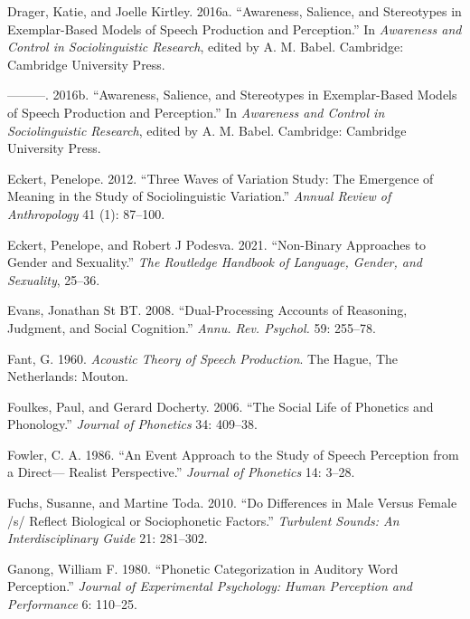 \documentclass[
  letterpaper,
  DIV=11,
  numbers=noendperiod]{scrartcl}
\newlength{\cslhangindent}
\newenvironment{CSLReferences}[2] %
 {\begin{list}{}{%
  \setlength{\itemindent}{0pt}
  \setlength{\leftmargin}{0pt}
  \setlength{\parsep}{0pt}
  \ifodd #1
   \setlength{\leftmargin}{\cslhangindent}
   \setlength{\itemindent}{-1\cslhangindent}
  \fi
  \setlength{\itemsep}{#2\baselineskip}}}
 {\end{list}}
\begin{document}
\begin{CSLReferences}{1}{0}
Drager, Katie, and Joelle Kirtley. 2016a. {``Awareness, Salience, and
Stereotypes in Exemplar-Based Models of Speech Production and
Perception.''} In \emph{Awareness and Control in Sociolinguistic
Research}, edited by A. M. Babel. Cambridge: Cambridge University Press.

---------. 2016b. {``Awareness, Salience, and Stereotypes in
Exemplar-Based Models of Speech Production and Perception.''} In
\emph{Awareness and Control in Sociolinguistic Research}, edited by A.
M. Babel. Cambridge: Cambridge University Press.

Eckert, Penelope. 2012. {``Three Waves of Variation Study: {The}
Emergence of Meaning in the Study of Sociolinguistic Variation.''}
\emph{Annual Review of Anthropology} 41 (1): 87--100.

Eckert, Penelope, and Robert J Podesva. 2021. {``Non-Binary Approaches
to Gender and Sexuality.''} \emph{The Routledge Handbook of Language,
Gender, and Sexuality}, 25--36.

Evans, Jonathan St BT. 2008. {``Dual-Processing Accounts of Reasoning,
Judgment, and Social Cognition.''} \emph{Annu. Rev. Psychol.} 59:
255--78.

Fant, G. 1960. \emph{Acoustic Theory of Speech Production}. The Hague,
The Netherlands: Mouton.

Foulkes, Paul, and Gerard Docherty. 2006. {``The Social Life of
Phonetics and Phonology.''} \emph{Journal of Phonetics} 34: 409--38.

Fowler, C. A. 1986. {``An Event Approach to the Study of Speech
Perception from a Direct--- Realist Perspective.''} \emph{Journal of
Phonetics} 14: 3--28.

Fuchs, Susanne, and Martine Toda. 2010. {``Do Differences in Male Versus
Female /s/ Reflect Biological or Sociophonetic Factors.''}
\emph{Turbulent Sounds: An Interdisciplinary Guide} 21: 281--302.

Ganong, William F. 1980. {``Phonetic Categorization in Auditory Word
Perception.''} \emph{Journal of Experimental Psychology: Human
Perception and Performance} 6: 110--25.


\end{CSLReferences}
\end{document}

